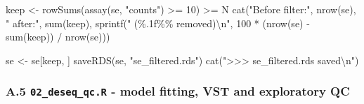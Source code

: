 \documentclass[
  11pt,
  a4paper,
]{article}
\newenvironment{Shaded}{}{}
\newcommand{\DecValTok}[1]{\textcolor[rgb]{0.25,0.63,0.44}{#1}}
\newcommand{\FunctionTok}[1]{\textcolor[rgb]{0.02,0.16,0.49}{#1}}
\newcommand{\NormalTok}[1]{#1}
\newcommand{\OtherTok}[1]{\textcolor[rgb]{0.00,0.44,0.13}{#1}}
\newcommand{\SpecialCharTok}[1]{\textcolor[rgb]{0.25,0.44,0.63}{#1}}
\newcommand{\StringTok}[1]{\textcolor[rgb]{0.25,0.44,0.63}{#1}}
\begin{document}
\begin{Shaded}
\begin{Highlighting}[]
\NormalTok{keep }\OtherTok{\textless{}{-}} \FunctionTok{rowSums}\NormalTok{(}\FunctionTok{assay}\NormalTok{(se, }\StringTok{"counts"}\NormalTok{) }\SpecialCharTok{\textgreater{}=} \DecValTok{10}\NormalTok{) }\SpecialCharTok{\textgreater{}=}\NormalTok{ N}
\FunctionTok{cat}\NormalTok{(}\StringTok{"Before filter:"}\NormalTok{, }\FunctionTok{nrow}\NormalTok{(se), }\StringTok{" after:"}\NormalTok{, }\FunctionTok{sum}\NormalTok{(keep),}
    \FunctionTok{sprintf}\NormalTok{(}\StringTok{" (\%.1f\%\% removed)}\SpecialCharTok{\textbackslash{}n}\StringTok{"}\NormalTok{, }\DecValTok{100} \SpecialCharTok{*}\NormalTok{ (}\FunctionTok{nrow}\NormalTok{(se) }\SpecialCharTok{{-}} \FunctionTok{sum}\NormalTok{(keep)) }\SpecialCharTok{/} \FunctionTok{nrow}\NormalTok{(se)))}

\NormalTok{se }\OtherTok{\textless{}{-}}\NormalTok{ se[keep, ]}
\FunctionTok{saveRDS}\NormalTok{(se, }\StringTok{"se\_filtered.rds"}\NormalTok{)}
\FunctionTok{cat}\NormalTok{(}\StringTok{"\textgreater{}\textgreater{}\textgreater{} se\_filtered.rds saved}\SpecialCharTok{\textbackslash{}n}\StringTok{"}\NormalTok{)}
\end{Highlighting}
\end{Shaded}

\hypertarget{a.5-02_deseq_qc.r---model-fitting-vst-and-exploratory-qc}{%
\subsubsection{\texorpdfstring{A.5 \texttt{02\_deseq\_qc.R} - model
fitting, VST and exploratory
QC}{A.5 02\_deseq\_qc.R - model fitting, VST and exploratory QC}}\label{a.5-02_deseq_qc.r---model-fitting-vst-and-exploratory-qc}}
\end{document}
